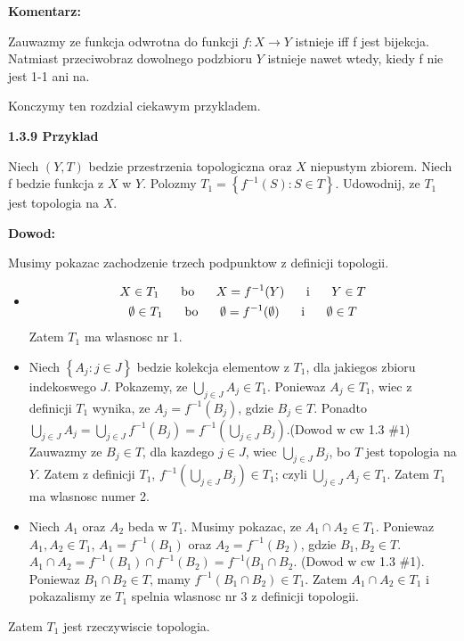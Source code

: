 \documentclass{article}
\begin{document}
\textbf{Komentarz:}

Zauwazmy ze funkcja odwrotna do funkcji $f: X \rightarrow Y$ istnieje iff f jest bijekcja. Natmiast przeciwobraz dowolnego podzbioru $Y$ istnieje nawet wtedy, kiedy f nie jest 1-1 ani na.

Konczymy ten rozdzial ciekawym przykladem.

\textbf{1.3.9 Przyklad}

Niech $(Y,T)$ bedzie przestrzenia topologiczna oraz $X$ niepustym zbiorem. Niech f bedzie funkcja z $X$ w $Y$. Polozmy $T_{1} = \left\{ f^{-1}(S) : S \in T \right\}$. Udowodnij, ze $T_{1}$ jest topologia na $X$.

\textbf{Dowod:}

Musimy pokazac zachodzenie trzech podpunktow z definicji topologii.
\begin{itemize}
    \item

        \begin{gather}        
            X \in T_{1} \hspace{5mm} \text{ bo } \hspace{5mm} X = f^{-1}(Y)\hspace{5mm}  \text{ i } \hspace{5mm} Y \in T \\ 
            \emptyset \in T_{1} \hspace{5mm} \text{ bo } \hspace{5mm} \emptyset = f^{-1}(\emptyset) \hspace{5mm} \text{ i } \hspace{5mm} \emptyset \in T
        \end{gather}
        Zatem $T_{1}$ ma wlasnosc nr 1.
    \item  Niech $\left\{ A_{j}: j \in J \right\}$ bedzie kolekcja elementow z $T_{1}$, dla jakiegos zbioru indekoswego $J$. Pokazemy, ze $\bigcup\limits_{j \in J}A_{j} \in T_{1}$. Poniewaz $A_{j} \in T_{1}$, wiec z definicji $T_{1}$ wynika, ze $A_{j} = f^{-1}(B_{j})$, gdzie $B_{j} \in T$. Ponadto $ \bigcup\limits_{j \in J}A_{j} = \bigcup\limits_{j \in J}f^{-1}(B_{j}) = f^{-1}(\bigcup\limits_{j \in J}B_{j})$.(Dowod w cw 1.3 $\#1$)
        Zauwazmy ze $B_{j} \in T$, dla kazdego $j \in J$, wiec $\bigcup\limits_{j \in J}B_{j}$, bo $T$ jest topologia na $Y$. Zatem z definicji $T_{1}$, $f^{-1}(\bigcup\limits_{j \in J}B_{j}) \in T_{1}$; czyli $\bigcup\limits_{j \in J}A_{j} \in T_{1}$. Zatem $T_{1}$ ma wlasnosc numer 2. 
    \item Niech $A_{1}$ oraz $A_{2}$ beda w $T_{1}$. Musimy pokazac, ze $A_{1} \cap A_{2} \in T_{1}$. Poniewaz $A_{1}, A_{2} \in T_{1}$, $A_{1} = f^{-1}(B_{1})$ oraz $A_{2} = f^{-1}(B_{2})$, gdzie $B_{1}, B_{2} \in T$. $A_{1} \cap A_{2} = f^{-1}(B_{1})\cap f^{-1}(B_{2}) = f^{-1}(B_{1} \cap B_{2}$. (Dowod w cw 1.3 $\#$1).
        Poniewaz $B_{1} \cap B_{2} \in T$, mamy $f^{-1}(B_{1} \cap B_{2}) \in T_{1}$. Zatem $A_{1} \cap A_{2} \in T_{1}$ i pokazalismy ze $T_{1}$ spelnia wlasnosc nr 3 z definicji topologii.
\end{itemize}
Zatem $T_{1}$ jest rzeczywiscie topologia.
\end{document}
